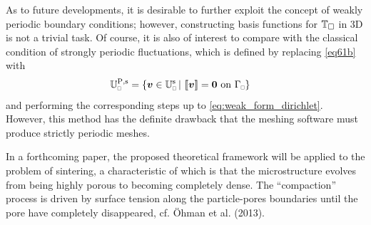 \documentclass{bmcart}
\newcommand{\eqtref}[1]{\eqref{#1}}
\DeclarePairedDelimiter{\jmp}{[\![}{]\!]}
\newcommand{\Periodic}{\mathrm{P}}
\newcommand{\rve}{
  {\mathchoice
   {\mbox{\scalebox{0.67}{$\Box$}}}
   {\mbox{\scalebox{0.67}{$\Box$}}}
   {\mbox{\scalebox{0.5}{$\Box$}}}
   {\mbox{\scalebox{0.375}{$\Box$}}}
  }
}
\begin{document}
As to future developments, it is desirable to further exploit the concept of weakly periodic boundary conditions; however, constructing basis functions for $\mathbb{T}_\Box$ in 3D is not a trivial task.
Of course, it is also of interest to compare with the classical condition of strongly periodic fluctuations, which is defined by replacing \eqtref{eq61b} with
\begin{align}
    \set{U}_\rve^{\Periodic,\fluct} &= \{\ta{v}\in \set{U}_\rve^\fluct \,|\,\, \jmp{\ta{v}}=\ta{0} \text{ on } \Gamma_\rve \}
\end{align}
and performing the corresponding steps up to \eqtref{eq:weak_form_dirichlet}.
However, this method has the definite drawback that the meshing software must produce strictly periodic meshes.


In a forthcoming paper, the proposed theoretical framework will be applied to the problem of sintering, a characteristic of which is that the microstructure evolves from being highly porous to becoming completely dense.
The ``compaction'' process is driven by surface tension along the particle-pores boundaries until the pore have completely disappeared, cf. Öhman et al. (2013).


% 
% 
% 
% 
% 
% 
% 
\end{document}
